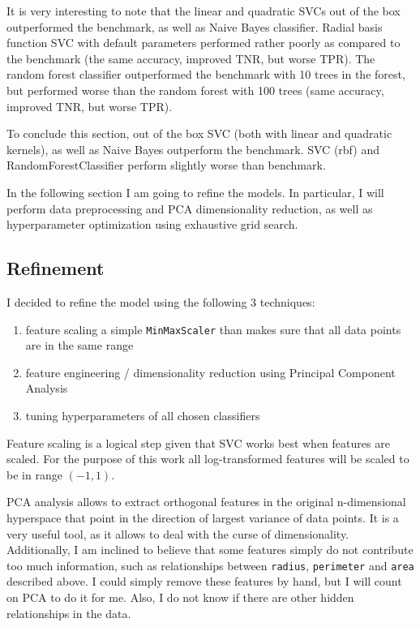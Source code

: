 \documentclass[10pt, a4paper]{article}
\begin{document}


It is very interesting to note that the linear and quadratic SVCs out of the box outperformed the benchmark, as well as Naive Bayes classifier. Radial basis function SVC with default parameters performed rather poorly as compared to the benchmark (the same accuracy, improved TNR, but worse TPR). The random forest classifier outperformed the benchmark with 10 trees in the forest, but performed worse than the random forest with 100 trees (same accuracy, improved TNR, but worse TPR).

To conclude this section, out of the box SVC (both with linear and quadratic kernels), as well as Naive Bayes outperform the benchmark. SVC (rbf) and RandomForestClassifier perform slightly worse than benchmark.

In the following section I am going to refine the models. In particular, I will perform data preprocessing and PCA dimensionality reduction, as well as hyperparameter optimization using exhaustive grid search.

\subsection{Refinement}

I decided to refine the model using the following 3 techniques:
\begin{enumerate}
	\item feature scaling a simple \texttt{MinMaxScaler} than makes sure that all data points are in the same range
	\item feature engineering / dimensionality reduction using Principal Component Analysis
	\item tuning hyperparameters of all chosen classifiers
\end{enumerate}

Feature scaling is a logical step given that SVC works best when features are scaled\cite{svm-guide}. For the purpose of this work all log-transformed features will be scaled to be in range $(-1,1)$.

PCA analysis allows to extract orthogonal features in the original n-dimensional hyperspace that point in the direction of largest variance of data points. It is a very useful tool, as it allows to deal with the curse of dimensionality. Additionally, I am inclined to believe that some features simply do not contribute too much information, such as relationships between \texttt{radius}, \texttt{perimeter} and \texttt{area} described above. I could simply remove these features by hand, but I will count on PCA to do it for me. Also, I do not know if there are other hidden relationships in the data.
\end{document}
